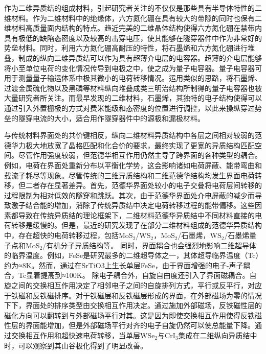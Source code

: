 作为二维异质结的组成材料，引起研究者关注的不仅仅是那些具有半导体特性的二维材料。作为二维材料中的绝缘体，六方氮化硼在具有较大的带隙的同时也保有二维材料高质量面内结构的特点。趋近完美的二维晶体结构使得六方氮化硼在禁带内具有极低的缺陷态密度以及较高的击穿电压，使其能够在隧穿器件中作为非常好的势垒材料。同时，利用六方氮化硼高耐压的特性，将石墨烯和六方氮化硼进行堆叠，制成的纵向二维异质结可以作为具有超薄介电层的电容器。超薄的介电层能够将小至单位电荷的变化情况传导到电极之中，使之成为量子电容器。量子电容器可用于测量量子输运体系中极其微小的电荷转移情况。运用类似的思路，将石墨烯、过渡金属硫化物以及黑磷等材料纵向堆叠成类三明治结构所制得的量子电容器也被大量研究者所关注。而最早发现的二维材料，石墨烯，其独特的电子结构使得可以通过引入外置栅极的方式对费米能级和态密度的位置进行调控，以此来操纵穿过势垒的隧穿电流的大小，适合用作隧穿器件中的源极和漏极材料。

与传统材料界面处的共价键相反，纵向二维材料异质结构中各层之间相对较弱的范德华力极大地放宽了晶格匹配和化合价的要求，最终实现了更宽的异质结构匹配空间。尽管作用强度较弱，但范德华相互作用仍然主导了跨界面的各种类型的耦合。例如，电荷在界面处重新分布以平衡化学势，这会影响诸如电荷屏蔽、能带弯曲和载流子耗尽等现象。尽管传统的三维异质结构和二维范德华结构均发生界面电荷转移，但二者存在显著差异。首先，范德华界面处较小的电子交叠将电荷层间转移的过程限制为相对低效的隧穿和跳跃。其次，由于范德华界面处介电屏蔽的减少而导致激子结合能的增加，消除了传统异质结中决定电荷转移过程的能带偏移。这些因素都导致在传统异质结的理论框架下，二维材料范德华异质结中不同材料直接的电荷转移是缓慢的。但是，最近的研究发现了在部分二维材料组成的范德华异质结构中，存在超快的电荷转移过程，包括MoS$_2$/WS$_2$，MoS$_2$/石墨烯，WS$_2$/石墨烯量子点和MoS$_2$/有机分子异质结构等。%
同时，界面耦合也会强烈地影响二维超导体的临界温度。例如，FeSe是研究最多的二维超导体之一，其体超导临界温度（Tc）约为≈8K。然而，通过在SrTiO3上生长单层FeSe，由于界面增强的电子-声子耦合，Tc显着提高到≈100K。%
除电子耦合外，自旋自由度还引入了界面磁耦合。自旋之间的交换相互作用决定了相邻电子之间的自旋排列方式，平行或反平行，对应于铁磁和反铁磁排序。对于铁磁层和反铁磁层形成的界面，在外部磁场为零的情况下下，界面处的排序类型由交换相互作用决定。通过施加外部磁场，反铁磁性层的磁化方向可以翻转到与外部磁场平行对其。这是因为即使交换相互作用使得反铁磁性层的界面能增加，但是外部磁场平行对齐的电子自旋仍然可以使总能量下降。通过交换相互作用和超快速电荷转移，当单层WSe$_2$与CrI$_3$集成在二维纵向异质结中时，可以观察到其山谷极化得到了明显改善。%

